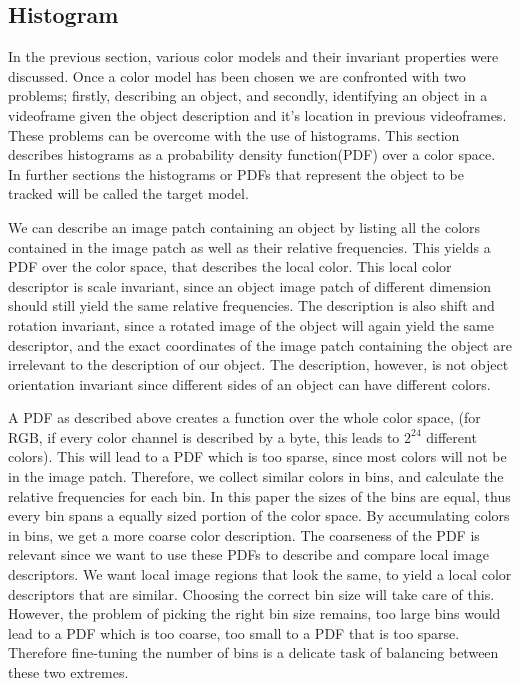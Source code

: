 \documentclass[a4paper,11pt]{article}
\begin{document}
		 

\subsection{Histogram}

In the previous section, various color models and their invariant properties were discussed. Once a color model has been chosen we are confronted with two problems; firstly, describing an object, and secondly, identifying an object in a videoframe given the object description and it's location in previous videoframes. These problems can be overcome with the use of histograms. This section describes histograms as a probability density function(PDF) over a color space. In further sections the histograms or PDFs that represent the object to be tracked will be called the target model.



We can describe an image patch containing an object by listing all the colors contained in the image patch as well as their relative frequencies. This yields a PDF over the color space, that describes the local color. This local color descriptor is scale invariant, since an object image patch of different dimension should still yield the same relative frequencies. The description is also shift and rotation invariant, since a rotated image of the object will again yield the same descriptor, and the exact coordinates of the image patch containing the object are irrelevant to the description of our object. The description, however, is not object orientation invariant since different sides of an object can have different colors. 



A PDF as described above creates a function over the whole color space, (for RGB, if every color channel is described by a byte, this leads to $2^{24}$ different colors). This will lead to a PDF which is too sparse, since most colors will not be in the image patch. Therefore, we collect similar colors in bins, and calculate the relative frequencies for each bin. In this paper the sizes of the bins are equal, thus every bin spans a equally sized portion of the color space. By accumulating colors in bins, we get a more coarse color description. The coarseness of the PDF is relevant since we want to use these PDFs to describe and compare local image descriptors. We want local image regions that look the same, to yield a local color descriptors that are similar.  Choosing the correct bin size will take care of this. However, the problem of picking the right bin size remains, too large bins would lead to a PDF which is too coarse, too small to a PDF that is too sparse. Therefore fine-tuning the number of bins is a delicate task of balancing between these two extremes. 
\end{document}
